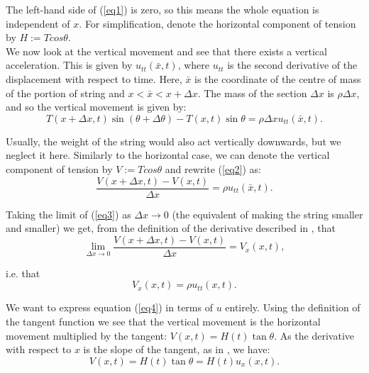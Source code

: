 \documentclass[a4paper, 12pt]{article}
\numberwithin{equation}{section}
\begin{document}
The left-hand side of (\ref{eq1}) is zero, so this means the whole equation is independent of $x$. For simplification, 
denote the horizontal component of tension by $H:= Tcos\theta$. \\

We now look at the vertical movement and see that there exists a vertical acceleration. This is given by $u_{tt} (\bar{x},t)$, 
where $u_{tt}$ is the second derivative of the displacement with respect to time. Here, $\bar{x}$ is 
the coordinate of the centre of mass of the portion of string and $x<\bar{x}<x+\Delta x$. 
The mass of the section $\Delta x$ is $\rho\Delta x$, and so the vertical movement is given by:
 \begin{equation} \label{eq2}
    T(x+\Delta x,t)\sin{(\theta + \Delta \theta)}-T(x,t)\sin{\theta}=\rho\Delta x u_{tt} (\bar{x},t).
 \end{equation}

 Usually, the weight of the string would also act vertically downwards, but we
 neglect it here. Similarly to the horizontal case, we can denote the vertical
 component of tension by $V:=Tcos\theta$ and rewrite (\ref{eq2}) as:
 \begin{equation} \label{eq3}
    \frac{V(x+\Delta x,t)-V(x,t)}{\Delta x}=\rho u_{tt} (\bar{x},t).
 \end{equation}

 Taking the limit of (\ref{eq3}) as $\Delta x \rightarrow 0$ (the equivalent of
 making the string smaller and smaller) we get, from the definition of the
 derivative described in \cite[Ch. 9]{Spi}, that 
 \begin{equation*}
    \lim_{\Delta x \rightarrow 0}\frac{V(x+\Delta x,t)-V(x,t)}{\Delta x}=V_x(x,t),
 \end{equation*}

i.e. that 
\begin {equation} \label{eq4}
    V_x(x,t)=\rho u_{tt} (x,t).
\end{equation}

We want to express equation (\ref{eq4}) in terms of $u$ entirely. Using the
definition of the tangent function we see that the vertical movement is the
horizontal movement multiplied by the tangent: $V(x, t)=H(t)\tan{\theta}$. As the
derivative with respect to $x$ is the slope of the tangent, as in \cite[Ch.
9]{Spi}, we have:
\begin{equation} \label{eq5}
    V(x,t)=H(t)\tan{\theta}=H(t)u_x(x,t).
\end{equation}
\end{document}

